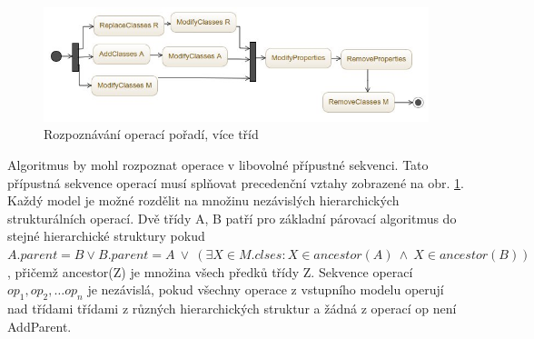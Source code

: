 \documentclass[11pt,twoside,a4paper]{book}
\begin{document}
% 

\begin{figure}[H]
\begin{center}
\includegraphics[width=15cm]{figures/recognition_order_basic2.jpg}
\caption{Rozpoznávání operací pořadí, více tříd}
\label{fig:recog_ops_order2}
\end{center}
\end{figure}
\FloatBarrier

 Algoritmus by mohl rozpoznat operace v libovolné přípustné sekvenci. Tato
 přípustná sekvence operací musí splňovat precedenční vztahy zobrazené na obr.
 \ref{fig:recog_ops_order2}. Každý model je možné rozdělit na množinu
 nezávislých hierarchických strukturálních operací. Dvě třídy A, B patří pro základní
 párovací algoritmus do stejné hierarchické struktury pokud $A.parent = B \vee
 B.parent = A \ \vee \ (\exists X \in M.clses: X \in ancestor(A)\ \wedge\ X \in
 ancestor(B))$, přičemž ancestor(Z) je množina všech předků třídy Z. Sekvence
 operací $op_1, op_2, \ldots op_n$ je nezávislá, pokud všechny operace z
 vstupního modelu operují nad třídami třídami z různých hierarchických struktur
  a žádná z operací op není AddParent. 
  
\end{document}
